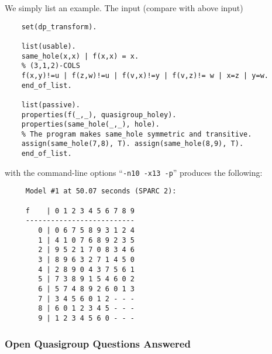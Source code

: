 We simply list an example. The input (compare with above input)
{\small \begin{verbatim}
    set(dp_transform).

    list(usable).
    same_hole(x,x) | f(x,x) = x.
    % (3,1,2)-COLS
    f(x,y)!=u | f(z,w)!=u | f(v,x)!=y | f(v,z)!= w | x=z | y=w.
    end_of_list.

    list(passive).
    properties(f(_,_), quasigroup_holey).
    properties(same_hole(_,_), hole).
    % The program makes same_hole symmetric and transitive.
    assign(same_hole(7,8), T). assign(same_hole(8,9), T).
    end_of_list.
\end{verbatim}}  \noindent
with the command-line options ``\verb:-n10 -x13 -p:'' produces the following:
\newpage
{\small \begin{verbatim}
     Model #1 at 50.07 seconds (SPARC 2):

     f    | 0 1 2 3 4 5 6 7 8 9
     --------------------------
        0 | 0 6 7 5 8 9 3 1 2 4
        1 | 4 1 0 7 6 8 9 2 3 5
        2 | 9 5 2 1 7 0 8 3 4 6
        3 | 8 9 6 3 2 7 1 4 5 0
        4 | 2 8 9 0 4 3 7 5 6 1
        5 | 7 3 8 9 1 5 4 6 0 2
        6 | 5 7 4 8 9 2 6 0 1 3
        7 | 3 4 5 6 0 1 2 - - -
        8 | 6 0 1 2 3 4 5 - - -
        9 | 1 2 3 4 5 6 0 - - -
\end{verbatim}}

\subsubsection{Open Quasigroup Questions Answered}

